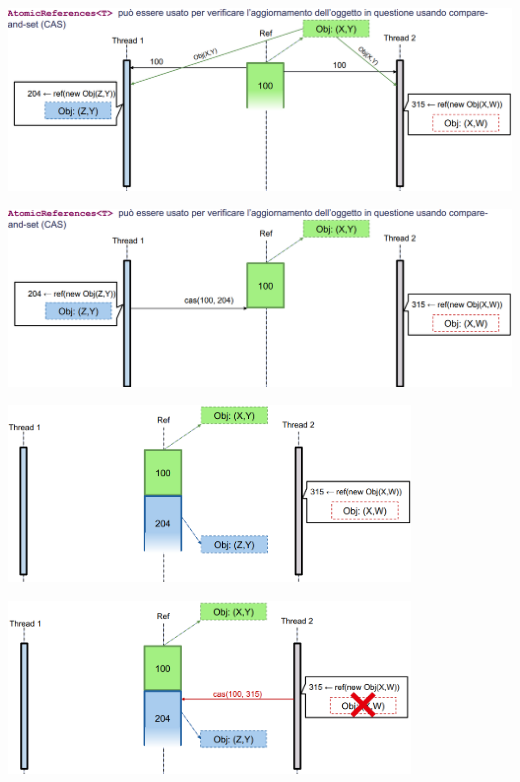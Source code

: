 \documentclass[12pt]{article}
\begin{document}
\begin{center}
    \includegraphics[width = 1\textwidth]{Images/96.PNG}
\end{center}
\begin{center}
    \includegraphics[width = 1\textwidth]{Images/97.PNG}
\end{center}
\begin{center}
    \hfill
    \includegraphics[width = 0.80\textwidth]{Images/98.PNG}
\end{center}
\begin{center}
    \hfill
    \includegraphics[width = 0.80\textwidth]{Images/99.PNG}
\end{center}
\end{document}
